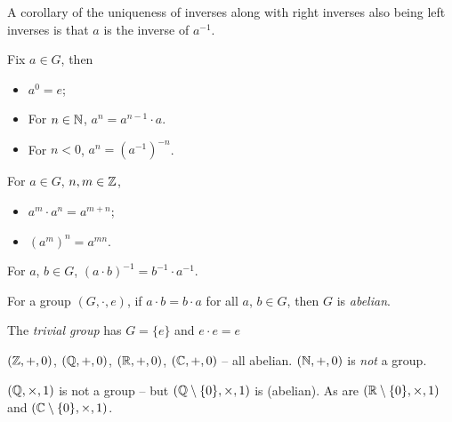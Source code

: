 \documentclass{../../template/note}
\begin{document}
    A corollary of the uniqueness of inverses along with right inverses also being left inverses is that \(a\) is the inverse of \(a^{-1}\).

    \begin{definition}
        Fix \(a \in G\), then
        \begin{itemize}
            \item \(a^0 = e\);
            \item For \(n \in \mathbb N\), \(a^n = a^{n-1} \cdot a\).
            \item For \(n < 0\), \(a^n = (a^{-1})^{-n}\).
        \end{itemize}        
    \end{definition}
    
    \begin{proposition}
        For \(a \in G\), \(n, m \in \mathbb Z\),
        \begin{itemize}
            \item \(a^m \cdot a^n = a^{m+n}\);
            \item \((a^m)^n = a^{mn}\).
        \end{itemize}
    \end{proposition}
    
    \begin{proposition}
        For \(a\), \(b \in G\), \((a\cdot b)^{-1} = b^{-1}\cdot a^{-1}\).
    \end{proposition}
    
    \begin{definition}
        For a group \((G, \cdot, e)\), if \(a \cdot b = b \cdot a\) for all \(a\), \(b \in G\), then \(G\) is \emph{abelian}.
    \end{definition}
    
    \begin{example*}
        The \emph{trivial group} has \(G = \{e\}\) and \(e \cdot e = e\)
    \end{example*}
    
    

    \begin{example*}
        \((\mathbb Z, +, 0)\), \((\mathbb Q, +, 0)\), \((\mathbb R, +, 0)\), \((\mathbb C, +, 0)\) -- all abelian. \((\mathbb N, +, 0)\) is \emph{not} a group.
    \end{example*}

    \begin{example*}
        \((\mathbb Q, \times, 1)\) is not a group -- but \((\mathbb Q \setminus \{0\}, \times, 1)\) is (abelian). As are \((\mathbb R \setminus \{0\}, \times, 1)\) and \((\mathbb C \setminus \{0\}, \times, 1)\).
    \end{example*}
    
\end{document}
